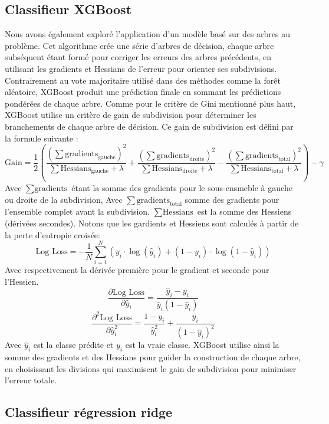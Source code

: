 \documentclass{article}
\begin{document}
\subsection{Classifieur XGBoost}
Nous avons également exploré l’application d’un modèle basé sur des arbres au problème. Cet algorithme crée une série d'arbres de décision, chaque arbre subséquent étant formé pour corriger les erreurs des arbres précédents, en utilisant les gradients et Hessians de l’erreur pour orienter ses subdivisions. Contrairement au vote majoritaire utilisé dans des méthodes comme la forêt aléatoire, XGBoost produit une prédiction finale en sommant les prédictions pondérées de chaque arbre. Comme pour le critère de Gini mentionné plus haut, XGBoost utilise un critère de gain de subdivision pour déterminer les branchements de chaque arbre de décision. Ce gain de subdivision est défini par la formule suivante : 
$$\text{Gain} = \frac{1}{2} \left( \frac{(\sum \text{gradients}_{\text{gauche}})^2}{\sum \text{Hessians}_{\text{gauche}} + \lambda} + \frac{(\sum \text{gradients}_{\text{droite}})^2}{\sum \text{Hessians}_{\text{droite}} + \lambda} - \frac{(\sum \text{gradients}_{\text{total}})^2}{\sum \text{Hessians}_{\text{total}} + \lambda} \right) - \gamma$$
Avec $\sum \text{gradients}$ étant la somme des gradients pour le sous-ensmeble à gauche ou droite de la subdivision, 
Avec $\sum \text{gradients}_{\text{total}}$ somme des gradients pour l’ensemble complet avant la subdivision. $\sum \text{Hessians}$ est la somme des Hessiens (dérivées secondes). Notons que les gardients et Hessiens sont calculés à partir de la perte d'entropie croisée: $$\text{Log Loss} = -\frac{1}{N} \sum_{i=1}^{N} \left( y_i \cdot \log(\hat{y}_i) + (1 - y_i) \cdot \log(1 - \hat{y}_i) \right)$$
Avec respectivement la dérivée première pour le gradient et seconde pour l'Hessien.
$$\frac{\partial \text{Log Loss}}{\partial \hat{y}_i} = \frac{\hat{y}_i - y_i}{\hat{y}_i (1 - \hat{y}_i)}$$
$$\frac{\partial^2 \text{Log Loss}}{\partial \hat{y}_i^2} = \frac{1 - y_i}{\hat{y}_i^2} + \frac{y_i}{(1 - \hat{y}_i)^2}
$$
Avec  $\hat{y}_i$ est la classe prédite et $y_i$ est la vraie classe.
XGBoost utilise ainsi la somme des gradients et des Hessians pour guider la construction de chaque arbre, en choisissant les divisions qui maximisent le gain de subdivision pour minimiser l’erreur totale.  
\subsection{Classifieur régression ridge}
\end{document}
